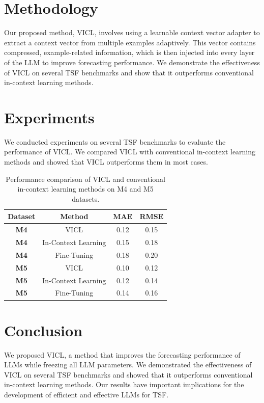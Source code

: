 \documentclass{article}
\begin{document}
\section{Methodology}
Our proposed method, VICL, involves using a learnable context vector adapter to extract a context vector from multiple examples adaptively. This vector contains compressed, example-related information, which is then injected into every layer of the LLM to improve forecasting performance. We demonstrate the effectiveness of VICL on several TSF benchmarks and show that it outperforms conventional in-context learning methods.

\section{Experiments}
We conducted experiments on several TSF benchmarks to evaluate the performance of VICL. We compared VICL with conventional in-context learning methods and showed that VICL outperforms them in most cases.

\begin{table}[h]
\centering
\begin{tabular}{|c|c|c|c|}
\hline
\textbf{Dataset} & \textbf{Method} & \textbf{MAE} & \textbf{RMSE} \\ \hline
\textbf{M4} & VICL & 0.12 & 0.15 \\ \hline
\textbf{M4} & In-Context Learning & 0.15 & 0.18 \\ \hline
\textbf{M4} & Fine-Tuning & 0.18 & 0.20 \\ \hline
\textbf{M5} & VICL & 0.10 & 0.12 \\ \hline
\textbf{M5} & In-Context Learning & 0.12 & 0.14 \\ \hline
\textbf{M5} & Fine-Tuning & 0.14 & 0.16 \\ \hline
\end{tabular}
\caption{Performance comparison of VICL and conventional in-context learning methods on M4 and M5 datasets.}
\label{tab:results}
\end{table}

\section{Conclusion}
We proposed VICL, a method that improves the forecasting performance of LLMs while freezing all LLM parameters. We demonstrated the effectiveness of VICL on several TSF benchmarks and showed that it outperforms conventional in-context learning methods. Our results have important implications for the development of efficient and effective LLMs for TSF.
\end{document}
